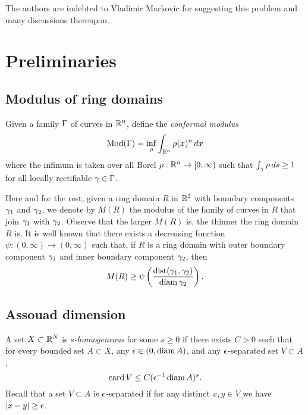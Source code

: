 \documentclass{amsart}
\DeclareMathOperator{\dist}{dist}
\DeclareMathOperator{\card}{card}
\begin{document}
The authors are indebted to Vladimir Markovic for suggesting this problem and many discussions thereupon.













\section{Preliminaries}\label{sec:prelim}

\subsection{Modulus of ring domains}

Given a family $\Gamma$ of curves in $\mathbb{R}^n$, define the \emph{conformal modulus}
\[ \operatorname{Mod}(\Gamma) = \inf_{\rho} \int_{\mathbb{R}^n}\rho(x)^n\, dx \]
where the infimum is taken over all Borel $\rho:\mathbb{R}^n \to [0,\infty)$ such that $\int_{\gamma}\rho\, ds \geq 1$ for all locally rectifiable $\gamma\in \Gamma$.

Here and for the rest, given 
a ring domain $R$ in $\mathbb{R}^2$ with boundary components $\gamma_1$ and $\gamma_2$, we denote by $M(R)$ the modulus of  the family of curves in $R$ that join $\gamma_1$ with $\gamma_2$.
Observe that the larger $M(R)$ is, the thinner the ring domain $R$ is.
It is well known \cite{Loewner} that there exists a decreasing function $\psi:(0,\infty) \to (0,\infty)$ such that, if $R$ is a ring domain with outer boundary component $\gamma_1$ and inner boundary component $\gamma_2$, then
\begin{equation}\label{eq:Loewner}
 M(R) \geq \psi\left( \frac{\dist(\g_1,\g_2)}{\diam{\g_2}} \right).
\end{equation}




\subsection{Assouad dimension}

A set $X\subset \mathbb{R}^N$ is \emph{$s$-homogeneous} for some $s\geq 0$ if there exists $C>0$ such that for every bounded set $A\subset X$, any $\epsilon\in (0,\operatorname{diam}{A})$, and any $\epsilon$-separated set $V\subset A$, 
\[\card{V} \leq C(\e^{-1}\diam{A})^{s}.\]
Recall that a set $V\subset A$ is $\epsilon$-separated if for any distinct $x,y \in V$ we have $|x-y|\geq \epsilon$.
\end{document}
